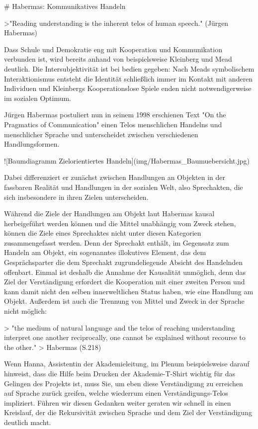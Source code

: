 # Habermas: Kommunikatives Handeln

>"Reading understanding is the inherent telos of human speech." (Jürgen Habermas)

Dass Schule und Demokratie eng mit Kooperation und Kommunikation verbunden ist, wird bereits anhand von beispielsweise Kleinberg und Mead deutlich.
Die Intersubjektivität ist bei bedien gegeben:
Nach Meads symbolischem Interaktionismus entsteht die Identität schließlich immer im Kontakt mit anderen Individuen und Kleinbergs Kooperationslose Spiele enden nicht notwendigerweise im sozialen Optimum.

Jürgen Habermas postuliert nun in seinem 1998 erschienen Text "On the Pragmatics of Communication" einen Telos menschlichen Handelns und menschlicher Sprache und unterscheidet zwischen verschiedenen Handlungsformen.

![Baumdiagramm Zielorientiertes Handeln](img/Habermas_Baumuebersicht.jpg)

Dabei differenziert er zunächst zwischen Handlungen an Objekten in der fassbaren Realität und Handlungen in der sozialen Welt, also Sprechakten, die sich insbesondere in ihren Zielen unterscheiden.

Während die Ziele der Handlungen am Objekt laut Habermas kausal herbeigeführt werden können und die Mittel unabhängig vom Zweck stehen, können die Ziele eines Sprechaktes nicht unter diesen Kategorien zusammengefasst werden.
Denn der Sprechakt enthält, im Gegensatz zum Handeln am Objekt, ein sogenanntes illokutives Element, das dem Gesprächsparter die dem Sprechakt zugrundeliegende Absicht des Handelnden offenbart.
Einmal ist deshalb die Annahme der Kausalität unmöglich, denn das Ziel der Verständigung erfordert die Kooperation mit einer zweiten Person und kann damit nicht den selben innerweltlichen Status haben, wie eine Handlung am Objekt.
Außerdem ist auch die Trennung von Mittel und Zweck in der Sprache nicht möglich:

 > "the medium of natural language and the telos of reaching understanding interpret one another reciprocally, one cannot be explained without recourse to the other."
> Habermas (S.218)

Wenn Hanna, Assistentin der Akademieleitung, im Plenum beispielsweise darauf hinweist, dass die Hilfe beim Drucken der Akademie-T-Shirt wichtig für das Gelingen des Projekts ist, muss Sie, um eben diese Verständigung zu erreichen auf Sprache zurück greifen, welche wiederrum einen Verständigungs-Telos impliziert.
Führen wir diesen Gedanken weiter geraten wir schnell in einen Kreislauf, der die Rekursivität zwischen Sprache und dem Ziel der Verständigung deutlich macht.

